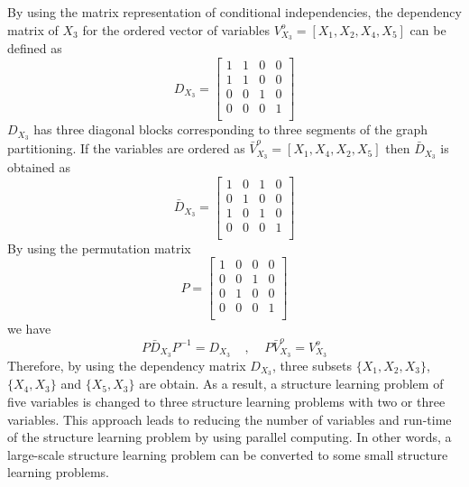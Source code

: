 \documentclass{article}
\begin{document}
By using the matrix representation of conditional independencies, the dependency matrix of \(X_3\) for the ordered vector of variables $V^o_{X_3} = [X_1, X_2, X_4, X_5]$ can be defined as
\begin{equation*}
D_{X_3} = \left[{\begin{array}{*{20}{c}} 
1 & 1 & 0 & 0\\
1 & 1 & 0 & 0\\
0 & 0 & 1 & 0\\
0 & 0 & 0 & 1\\
\end{array}}\right]
\end{equation*}
$D_{X_3}$ has three diagonal blocks corresponding to three segments of the graph partitioning. If the variables are ordered as $\bar V^o_{X_3} = [X_1, X_4, X_2, X_5]$ then $\bar D_{X_3}$ is obtained as
\begin{equation*}
\bar D_{X_3} = \left[{\begin{array}{*{20}{c}} 
1 & 0 & 1 & 0\\
0 & 1 & 0 & 0\\
1 & 0 & 1 & 0\\
0 & 0 & 0 & 1\\
\end{array}}\right]
\end{equation*}
By using the permutation matrix
\begin{equation*}
P = \left[{\begin{array}{*{20}{c}}
1 & 0 & 0 & 0\\
0 & 0 & 1 & 0\\
0 & 1 & 0 & 0\\
0 & 0 & 0 & 1\\
\end{array}}\right]
\end{equation*}
we have 
\begin{equation}
    P\bar D_{X_3} P^{-1} = D_{X_3}~~~~~,~~~~~P\bar V^o_{X_3} = V^o_{X_3}
\end{equation}
Therefore, by using the dependency matrix $D_{X_3}$, three subsets $\{X_1,X_2,X_3\}$, $\{X_4,X_3\}$ and $\{X_5,X_3\}$ are obtain. As a result, a structure learning problem of five variables is changed to three structure learning problems with two or three variables. This approach leads to reducing the number of variables and run-time of the structure learning problem by using parallel computing. In other words, a large-scale structure learning problem can be converted to some small structure learning problems.
\end{document}
